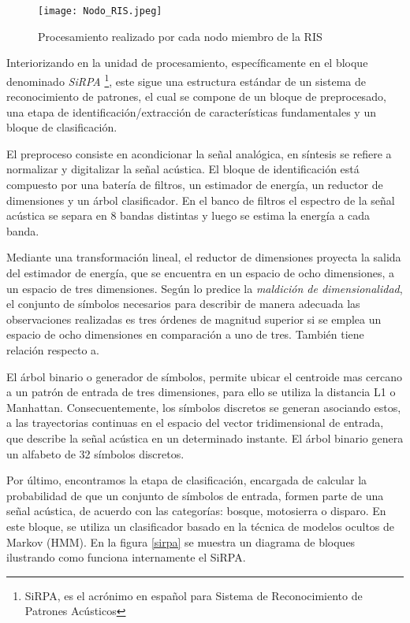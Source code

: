\begin{figure}[h]
\texttt{[image: Nodo\_RIS.jpeg]}
\centering
\caption{Procesamiento realizado por cada nodo miembro de la RIS \cite{Jordanthesis}}
\label{nodoRIS}
\end{figure}


Interiorizando en la unidad de procesamiento, específicamente en el bloque denominado \textit{SiRPA} \footnote{SiRPA, es el acrónimo en español para Sistema de Reconocimiento de Patrones Acústicos}, este sigue una estructura estándar de un sistema de reconocimiento de patrones, el cual se compone de un bloque de preprocesado, una etapa de identificación/extracción de características fundamentales y un bloque de clasificación.

El preproceso consiste en acondicionar la señal analógica, en síntesis se refiere a normalizar y digitalizar la señal acústica. El bloque de identificación está compuesto por una batería de filtros, un estimador de energía, un reductor de dimensiones y un árbol clasificador. En el banco de filtros el espectro de la señal acústica se separa en 8 bandas distintas y luego se estima la energía a cada banda.

Mediante una transformación lineal, el reductor de dimensiones proyecta la salida del estimador de energía, que se encuentra en un espacio de ocho dimensiones, a un espacio de tres dimensiones. Según lo predice la \textit{maldición de dimensionalidad}, el conjunto de símbolos necesarios para describir de manera adecuada las observaciones realizadas es tres órdenes de magnitud superior si se emplea un espacio de ocho dimensiones en comparación a uno de tres. También tiene relación respecto a. \cite{NeuralNetworks, Jordanthesis}

El árbol binario o generador de símbolos, permite ubicar el centroide mas cercano a un patrón de entrada de tres dimensiones, para ello se utiliza la distancia L1 o Manhattan. Consecuentemente, los símbolos discretos se generan asociando estos, a las trayectorias continuas en el espacio del vector tridimensional de entrada, que describe la señal acústica en un determinado instante. El árbol binario genera un alfabeto de 32 símbolos discretos. \cite{IEEE_Panama, TDS, Jcardenas, EmbededTech}

Por último, encontramos la etapa de clasificación, encargada de calcular la probabilidad de que un conjunto de símbolos de entrada, formen parte de una señal acústica, de acuerdo con las categorías: bosque, motosierra o disparo. En este bloque, se utiliza un clasificador basado en la técnica de modelos ocultos de Markov (HMM). En la figura \ref{sirpa} se muestra un diagrama de bloques ilustrando como funciona internamente el SiRPA.

